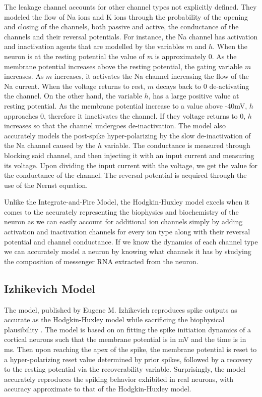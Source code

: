\documentclass[11pt]{article}
\begin{document}
The leakage channel accounts for other channel types not explicitly defined. They modeled the flow of Na ions and K ions through the probability of the opening and closing of the channels, both passive and active, the conductance of the channels and their reversal potentials. For instance, the Na channel has activation and inactivation agents that are modelled by the variables $m$ and $h$. When the neuron is at the resting potential the value of \textit{m} is approximately 0. As the membrane potential increases above the resting potential, the gating variable $m$ increases. As $m$ increases, it activates the Na channel increasing the flow of the Na current. When the voltage returns to rest, $m$ decays back to 0 de-activating the channel. On the other hand, the variable $h$, has a large positive value at resting potential. As the membrane potential increase to a value above -40mV, $h$ approaches 0, therefore it inactivates the channel. If they voltage returns to 0, $h$ increases so that the channel undergoes de-inactivation. The model also accurately models the post-spike hyper-polarizing by the slow de-inactivation  of the Na channel caused by the $h$ variable. The conductance is measured through blocking said channel, and then injecting it with an input current and measuring its voltage. Upon dividing the input current with the voltage, we get the value for the conductance of the channel. The reversal potential is acquired through the use of the Nernst equation.

Unlike the Integrate-and-Fire Model, the Hodgkin-Huxley model excels when it comes to the accurately representing the biophysics and biochemistry of the neuron as we can easily account for additional ion channels simply by adding activation and inactivation channels for every ion type along with their reversal potential and channel conductance. If we know the dynamics of each channel type we can accurately model a neuron by knowing what channels it has by studying the composition of messenger RNA extracted from the neuron.

\subsection{Izhikevich Model}
\label{sec:izhikevich_model}

The model, published by Eugene M. Izhikevich reproduces spike outputs as accurate as the Hodgkin-Huxley model while sacrificing the biophysical plausibility \citep{izhikevich_model}. The model is based on on fitting the spike initiation dynamics of a cortical neurons such that the membrane potential is in mV and the time is in ms. Then upon reaching the apex of the spike, the membrane potential is reset to a hyper-polarizing reset value determined by prior spikes, followed by a recovery to the resting potential via the recoverability variable. Surprisingly, the model accurately reproduces the spiking behavior exhibited in real neurons, with accuracy approximate to that of the Hodgkin-Huxley model.
\end{document}
